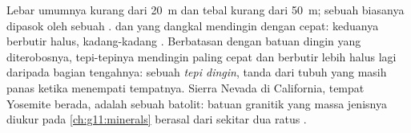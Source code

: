 Lebar  umumnya kurang dari \qty{20}{m} dan tebal  kurang dari
\qty{50}{m}; sebuah  biasanya dipasok oleh sebuah .  dan 
yang dangkal mendingin dengan cepat: keduanya berbutir halus, kadang-kadang
. Berbatasan dengan batuan dingin yang diterobosnya, tepi-tepinya
mendingin paling cepat dan berbutir lebih halus lagi daripada bagian tengahnya:
sebuah \emph{tepi dingin}, tanda dari tubuh yang masih panas ketika menempati
tempatnya. Sierra Nevada di California, tempat Yosemite berada, adalah sebuah
batolit: batuan granitik yang massa jenisnya diukur pada \cref{ch:g11:minerals}
berasal dari sekitar dua ratus .

